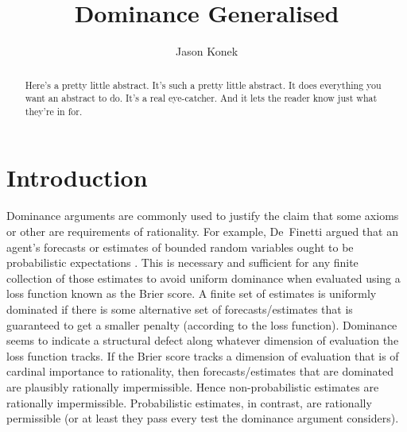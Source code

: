 \documentclass[11pt]{article}
\title{Dominance Generalised}
\author{Jason Konek}
\date{}
\theoremstyle{definition}
\theoremstyle{remark}
\begin{document}
\maketitle

\begin{abstract}
Here's a pretty little abstract. It's such a pretty little abstract. It does everything you want an abstract to do. It's a real eye-catcher. And it lets the reader know just what they're in for.

\end{abstract}




\section{Introduction}\label{sec:intro}


Dominance arguments are commonly used to justify the claim that some axioms or other are requirements of rationality. For example, De~Finetti argued that an agent's forecasts or estimates of bounded random variables ought to be probabilistic expectations \cite[\S1.6, \S3.3]{deFinetti1974}. This is necessary and sufficient for any finite collection of those estimates to avoid uniform dominance when evaluated using a loss function known as the Brier score. A finite set of estimates is uniformly dominated if there is some alternative set of forecasts/estimates that is guaranteed to get a smaller penalty (according to the loss function). Dominance seems to indicate a structural defect along whatever dimension of evaluation the loss function tracks. If the Brier score tracks a dimension of evaluation that is of cardinal importance to rationality, then forecasts/estimates that are dominated are plausibly rationally impermissible. Hence non-probabilistic estimates are rationally impermissible. Probabilistic estimates, in contrast, are rationally permissible (or at least they pass every test the dominance argument considers).
\end{document}
